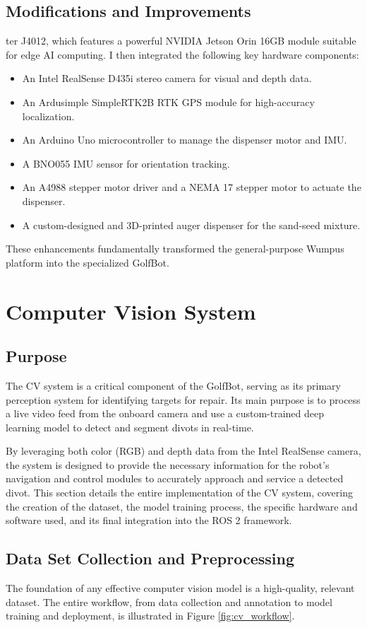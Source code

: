 \subsection{Modifications and Improvements} ter J4012, which features a powerful NVIDIA Jetson Orin 16GB module suitable for edge AI computing. I then integrated the following key hardware components:
\begin{itemize}
    \item An Intel RealSense D435i stereo camera for visual and depth data.
    \item An Ardusimple SimpleRTK2B RTK GPS module for high-accuracy localization.
    \item An Arduino Uno microcontroller to manage the dispenser motor and IMU.
    \item A BNO055 IMU sensor for orientation tracking.
    \item An A4988 stepper motor driver and a NEMA 17 stepper motor to actuate the dispenser.
    \item A custom-designed and 3D-printed auger dispenser for the sand-seed mixture.
\end{itemize}
These enhancements fundamentally transformed the general-purpose Wumpus platform into the specialized GolfBot.

\section{Computer Vision System}
\subsection{Purpose}
\label{ssec:cv_intro}
The \gls{CV} system is a critical component of the GolfBot, serving as its primary perception system for identifying targets for repair. Its main purpose is to process a live video feed from the onboard camera and use a custom-trained deep learning model to detect and segment divots in real-time.

By leveraging both color (\gls{RGB}) and depth data from the Intel RealSense camera, the system is designed to provide the necessary information for the robot's navigation and control modules to accurately approach and service a detected divot. This section details the entire implementation of the CV system, covering the creation of the dataset, the model training process, the specific hardware and software used, and its final integration into the ROS 2 framework.

\subsection{Data Set Collection and Preprocessing}
\label{ssec:cv_dataset}
The foundation of any effective computer vision model is a high-quality, relevant dataset. The entire workflow, from data collection and annotation to model training and deployment, is illustrated in Figure \ref{fig:cv_workflow}.

